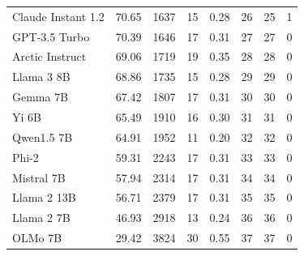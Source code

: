 \begin{tabular}{lrrrrrrr}
Claude Instant 1.2 & 70.65 & 1637 & 15 & 0.28 & 26 & 25 & 1 \\
GPT-3.5 Turbo & 70.39 & 1646 & 17 & 0.31 & 27 & 27 & 0 \\
Arctic Instruct & 69.06 & 1719 & 19 & 0.35 & 28 & 28 & 0 \\
Llama 3 8B & 68.86 & 1735 & 15 & 0.28 & 29 & 29 & 0 \\
Gemma 7B & 67.42 & 1807 & 17 & 0.31 & 30 & 30 & 0 \\
Yi 6B & 65.49 & 1910 & 16 & 0.30 & 31 & 31 & 0 \\
Qwen1.5 7B & 64.91 & 1952 & 11 & 0.20 & 32 & 32 & 0 \\
Phi-2 & 59.31 & 2243 & 17 & 0.31 & 33 & 33 & 0 \\
Mistral 7B & 57.94 & 2314 & 17 & 0.31 & 34 & 34 & 0 \\
Llama 2 13B & 56.71 & 2379 & 17 & 0.31 & 35 & 35 & 0 \\
Llama 2 7B & 46.93 & 2918 & 13 & 0.24 & 36 & 36 & 0 \\
OLMo 7B & 29.42 & 3824 & 30 & 0.55 & 37 & 37 & 0 \\
\bottomrule
\end{tabular}
